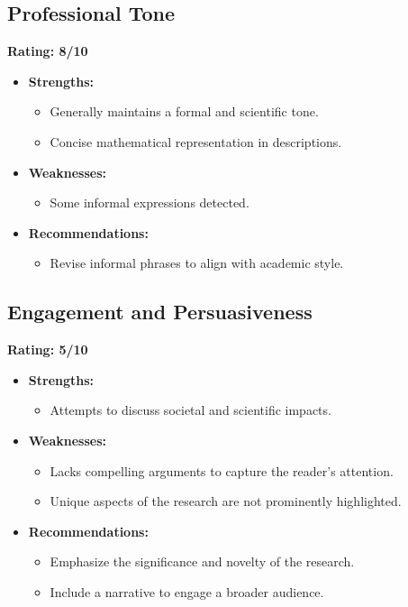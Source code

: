 \documentclass{article}
\begin{document}
\subsection{Professional Tone}
\textbf{Rating: 8/10}

\begin{itemize}
    \item \textbf{Strengths:}
    \begin{itemize}
        \item Generally maintains a formal and scientific tone.
        \item Concise mathematical representation in descriptions.
    \end{itemize}
    \item \textbf{Weaknesses:}
    \begin{itemize}
        \item Some informal expressions detected.
    \end{itemize}
    \item \textbf{Recommendations:}
    \begin{itemize}
        \item Revise informal phrases to align with academic style.
    \end{itemize}
\end{itemize}

\subsection{Engagement and Persuasiveness}
\textbf{Rating: 5/10}

\begin{itemize}
    \item \textbf{Strengths:}
    \begin{itemize}
        \item Attempts to discuss societal and scientific impacts.
    \end{itemize}
    \item \textbf{Weaknesses:}
    \begin{itemize}
        \item Lacks compelling arguments to capture the reader's attention.
        \item Unique aspects of the research are not prominently highlighted.
    \end{itemize}
    \item \textbf{Recommendations:}
    \begin{itemize}
        \item Emphasize the significance and novelty of the research.
        \item Include a narrative to engage a broader audience.
    \end{itemize}
\end{itemize}
\end{document}
